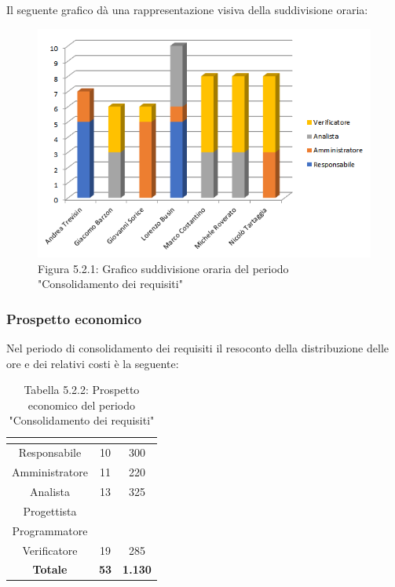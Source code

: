 Il seguente grafico dà una rappresentazione visiva della suddivisione oraria: \\
\begin{figure} [H]
	\centering
	\includegraphics[scale=1]{Res/ExcelGrafici/Grafici/ConsolidamentoOre.png}
	\caption{Figura 5.2.1: Grafico suddivisione oraria del periodo "Consolidamento dei requisiti"}\label{}
\end{figure}


\subsubsection{Prospetto economico}
Nel periodo di consolidamento dei requisiti il resoconto della distribuzione delle ore e dei relativi costi è la seguente:

\renewcommand{\arraystretch}{1.5}
\begin{table}[H]
\begin{center}
\begin{tabular}{|c|c|c|}
\hline
\rowcolor{title_row}
\textbf{\color{title_text}{Ruolo}}  & \textbf{\color{title_text}{Ore}} & \textbf{\color{title_text}{Costo in \euro}} \\ \hline
Responsabile    & 10 & 300 \\ \hline
Amministratore  & 11 & 220 \\ \hline
Analista        & 13 & 325 \\ \hline
Progettista     & & \\ \hline
Programmatore   & & \\ \hline
Verificatore    & 19 & 285 \\ \hline
\textbf{Totale} & \textbf{53}    & \textbf{1.130}    \\ \hline
\end{tabular}
\caption{Tabella 5.2.2: Prospetto economico del periodo "Consolidamento dei requisiti"\label{}}
\end{center}
\end{table}
\renewcommand{\arraystretch}{1}

